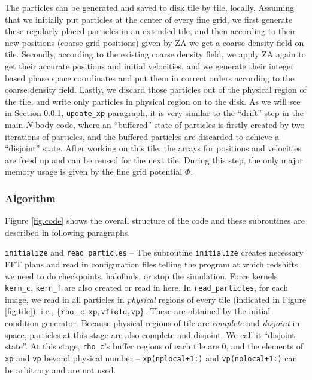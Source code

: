 \documentclass[10pt,twocolumn,preprint]{emulateapj}
\begin{document}
The particles can be generated and saved to disk tile by tile, locally. Assuming that we initially put particles at the center of every fine grid, we first generate these regularly placed particles in an extended tile, and then according to their new positions (coarse grid positions) given by ZA we get a coarse density field on tile. Secondly, according to the existing coarse density field, we apply ZA again to get their accurate positions and initial velocities, and we generate their integer based phase space coordinates and put them in correct orders according to the coarse density field. Lastly, we discard those particles out of the physical region of the tile, and write only particles in physical region on to the disk. As we will see in Section \ref{sss.algorithm}, {\tt update\_xp} paragraph, it is very similar to the ``drift'' step in the main $N$-body code, where an ``buffered'' state of particles is firstly created by two iterations of particles, and the buffered particles are discarded to achieve a ``disjoint'' state. After working on this tile, the arrays for positions and velocities are freed up and can be reused for the next tile. During this step, the only major memory usage is given by the fine grid potential $\Phi$.



\subsubsection{Algorithm}\label{sss.algorithm}
Figure \ref{fig.code} shows the overall structure of the code and these subroutines are described in following paragraphs. 

{\tt initialize} and {\tt read\_particles} -- The subroutine {\tt initialize} creates necessary FFT plans and read in configuration files telling the program at which redshifts we need to do checkpoints, halofinds, or stop the simulation. Force kernels {\tt kern\_c}, {\tt kern\_f} are also created or read in here. In {\tt read\_particles}, for each image, we read in all particles in {\it physical} regions of every tile (indicated in Figure \ref{fig.tile}), i.e., $\{{\tt rho\_c},{\tt xp},{\tt vfield},{\tt vp}\}$. These are obtained by the initial condition generator. Because physical regions of tile are {\it complete} and {\it disjoint} in space, particles at this stage are also complete and disjoint. We call it ``disjoint state''. At this stage, {\tt rho\_c}'s buffer regions of each tile are 0, and the elements of {\tt xp} and {\tt vp} beyond physical number -- {\tt xp(nplocal+1:)} and {\tt vp(nplocal+1:)} can be arbitrary and are not used.
\end{document}
